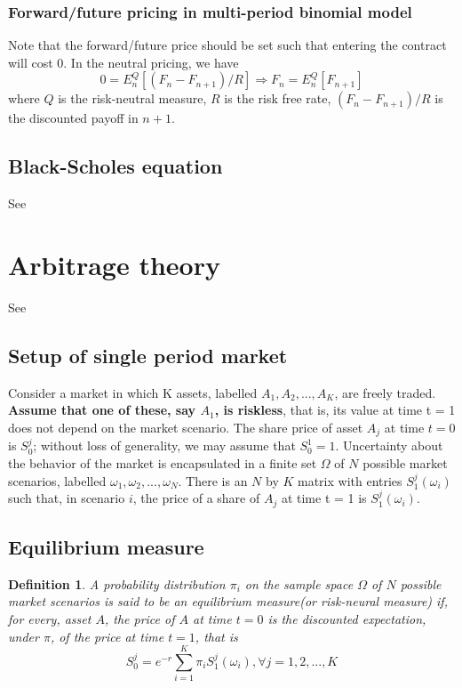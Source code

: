 \documentclass[a4paper,13pt]{report}
\newtheorem*{definition}{Definition}
\begin{document}
\subsubsection{Forward/future pricing in multi-period binomial model}
Note that the forward/future price should be set such that entering the contract will cost 0. In the neutral pricing, we have
$$0 = E^Q_n[(F_n-F_{n+1})/R] \Rightarrow F_n = E^Q_n[F_{n+1}]$$
where $Q$ is the risk-neutral measure, $R$ is the risk free rate, $(F_n-F_{n+1})/R$ is the discounted payoff in $n+1$. 

\subsection{Black-Scholes equation}
See \cite{wilmott1995mathematics}





\section{Arbitrage theory}
See \cite{bjork2004arbitrage}

\subsection{Setup of single period market}
Consider a market in which K assets, labelled $A_1, A_2, . . . , A_K$, are freely traded. \textbf{Assume that one of these, say $A_1$, is riskless}, that is, its value at time t = 1 does
not depend on the market scenario. The share price of asset $A_j$ at time $t = 0$ is $S_0^j$; without
loss of generality, we may assume that $S_0^1 = 1$. Uncertainty about the behavior of the market
is encapsulated in a finite set $\Omega$ of $N$ possible market scenarios, labelled $\omega_1, \omega_2,..., \omega_N$. There is an $N$ by $K$ matrix with entries $S_1^j(\omega_i)$ such that, in scenario $i$, the
price of a share of $A_j$ at time t = 1 is $S_1^j(\omega_i)$.\cite{Lalley2001mathematical}


\subsection{Equilibrium measure}
\begin{definition}
A probability distribution $\pi_i$ on the sample space $\Omega$ of $N$ possible market scenarios is said to be an equilibrium measure(or risk-neural measure) if, for every, asset $A$, the price of $A$ at time $t=0$ is the discounted expectation, under $\pi$, of the price at time $t=1$, that is \cite{Lalley2001mathematical}
$$S_0^j = e^{-r}\sum_{i=1}^K \pi_i S_1^j (\omega_i),\forall j=1,2,...,K$$
\end{definition}
\end{document}

